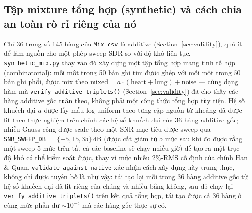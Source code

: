 \documentclass[11pt]{article}
\begin{document}
\subsection{Tập mixture tổng hợp (synthetic) và cách chia an toàn rò rỉ riêng của nó}
\label{sec:synthetic}

Chỉ 36 trong số 145 hàng của \texttt{Mix.csv} là additive
(Section~\ref{sec:validity}), quá ít để làm nguồn cho một phép sweep
SDR-so-với-độ-khó liên tục. \texttt{synthetic\_mix.py} thay vào đó xây
dựng một tập tổng hợp mang tính tổ hợp (combinatorial): mỗi một trong 50
bản ghi tim được ghép với mỗi một trong 50 bản ghi phổi, được mix theo
$\text{mixed} = a\cdot(\text{heart}+\text{lung}) + \text{noise}$ --- cùng
dạng hàm mà \texttt{verify\_additive\_triplets()}
(Section~\ref{sec:validity}) đã cho thấy các hàng additive gốc tuân theo,
không phải một công thức tổng hợp tùy tiện. Hệ số khuếch đại $a$ được lấy
mẫu log-uniform theo từng cặp nguồn từ khoảng đã được fit theo thực
nghiệm trên chính các hệ số khuếch đại của 36 hàng additive gốc; nhiễu
Gauss cộng được scale theo một SNR mục tiêu được sweep qua
\texttt{SNR\_SWEEP\_DB} $= \{-5, 15, 35\}$\,dB (được cắt giảm từ 5 mức sau
khi đo được rằng một sweep 5 mức trên tất cả các baseline sẽ chạy nhiều
giờ) để tạo ra một trục độ khó có thể kiểm soát được, thay vì mức nhiễu
2\%-RMS cố định của chính Han \& Quan. \texttt{validate\_against\_native}
xác nhận cách xây dựng này trung thực, không chỉ được tuyên bố là như
vậy: tái tạo lại mỗi trong 36 hàng additive gốc từ hệ số khuếch đại đã fit
riêng của chúng và nhiễu bằng không, sau đó chạy lại
\texttt{verify\_additive\_triplets()} trên kết quả tổng hợp, tái tạo được
cả 36 hàng ở cùng mức phần dư $\sim 10^{-4}$ mà các hàng gốc thực sự có.
\end{document}

